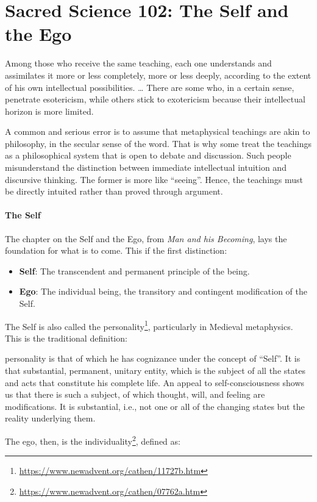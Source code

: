 \section{Sacred Science 102: The Self and the Ego}

\begin{quotex}
Among those who receive the same teaching, each one understands and assimilates it more or less completely, more or less deeply, according to the extent of his own intellectual possibilities. … There are some who, in a certain sense, penetrate esotericism, while others stick to exotericism because their intellectual horizon is more limited. 

\end{quotex}

A common and serious error is to assume that metaphysical teachings are akin to philosophy, in the secular sense of the word. That is why some treat the teachings as a philosophical system that is open to debate and discussion. Such people misunderstand the distinction between immediate intellectual intuition and discursive thinking. The former is more like “seeing”. Hence, the teachings must be directly intuited rather than proved through argument.

\paragraph{The Self}
The chapter on the Self and the Ego, from \emph{Man and his Becoming}, lays the foundation for what is to come. This if the first distinction:

\begin{itemize}
\item \textbf{Self}: The transcendent and permanent principle of the being. 
\item \textbf{Ego}: The individual being, the transitory and contingent modification of the Self. 
\end{itemize}
The Self is also called the personality\footnote{\url{https://www.newadvent.org/cathen/11727b.htm}}, particularly in Medieval metaphysics. This is the traditional definition:

\begin{quotex}
[The] personality is that of which he has cognizance under the concept of “Self”. It is that substantial, permanent, unitary entity, which is the subject of all the states and acts that constitute his complete life. An appeal to self-consciousness shows us that there is such a subject, of which thought, will, and feeling are modifications. It is substantial, i.e., not one or all of the changing states but the reality underlying them. 

\end{quotex}
The ego, then, is the individuality\footnote{\url{https://www.newadvent.org/cathen/07762a.htm}}, defined as:

